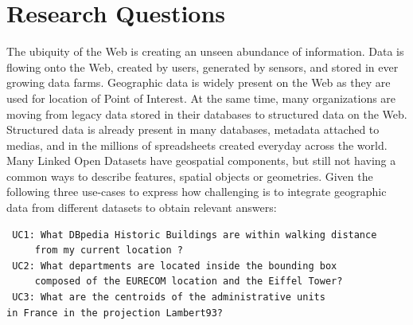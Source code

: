 \begin{figure}[ht!]
\end{figure}

\section{Research Questions}
\label{sec:questions}
The ubiquity of the Web is creating an unseen abundance of information. Data is flowing onto the Web, created by users, generated by sensors, and stored in ever growing data farms. Geographic data is widely present on the Web as they are used for location of Point of Interest. At the same time, many organizations are moving from legacy data stored in their databases to structured data on the Web. Structured data is already present in many databases, metadata attached to medias, and in the millions of spreadsheets created everyday across the world. Many Linked Open Datasets have geospatial components, but still not having a common ways to describe features, spatial objects or geometries. Given the following three use-cases to express how challenging is to integrate geographic data from different datasets to obtain relevant answers:
\begin{verbatim}
 UC1: What DBpedia Historic Buildings are within walking distance
     from my current location ?
 UC2: What departments are located inside the bounding box
     composed of the EURECOM location and the Eiffel Tower?
 UC3: What are the centroids of the administrative units
in France in the projection Lambert93?
\end{verbatim}

